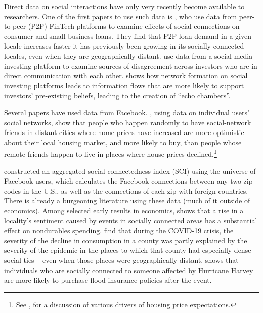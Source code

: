 Direct data on social interactions have only very recently become available to researchers.  One of the first papers to use such data is \cite{allen2018social}, who use data from peer-to-peer (P2P) FinTech platforms to examine effects of social connections on consumer and small business loans.  They find that P2P loan demand in a given locale increases faster it has previously been growing in its socially connected locales, even when they are geographically distant.  \cite{cookson_why_2020} use data from a social media investing platform to examine sources of disagreement across investors who are in direct communication with each other.  \cite{cookson2022echo} shows how network formation on social investing platforms leads to information flows that are more likely to support investors' pre-existing beliefs, leading to the creation of ``echo chambers''.

Several papers have used data from Facebook.  , using data on individual users' social networks, show that people who happen randomly to have social-network friends in distant cities where home prices have increased are more optimistic about their local housing market, and more likely to buy, than people whose remote friends happen to live in places where house prices declined.\footnote{See \kpshousingexpectationFull, for a discussion of various drivers of housing price expectations.}

\cite{bailey_social_2018} constructed an aggregated social-connectedness-index (SCI)  using the universe of Facebook users, which calculates the Facebook connections between any two zip codes in the U.S., as well as the connections of each zip with foreign countries.  There is already a burgeoning literature using these data (much of it outside of economics).  Among selected early results in economics, \cite{makridis2019effect} shows that a rise in a locality's sentiment caused by events in socially connected areas has a substantial effect on nondurables spending.  \cite{makridis2020learning} find that during the COVID-19 crisis, the severity of the decline in consumption in a county was partly explained by the severity of the epidemic in the places to which that county had especially dense social ties -- even when those places were geographically distant.
\cite{ratnadiwakara2021flooded} shows that individuals who are socially connected to someone affected by Hurricane Harvey are more likely to purchase flood insurance policies after the event. %

